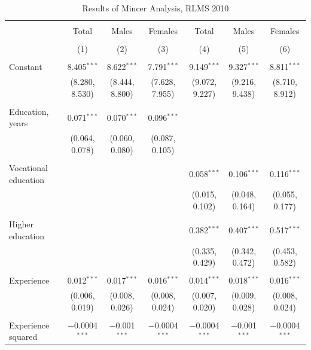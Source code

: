 \documentclass[alpha-refs]{wiley-article-01g}
\begin{document}
\begin{landscape}
	
	\fontsize{9}{11}
	\selectfont
	
	\begin{table}[!htbp] \centering 
\renewcommand{\arraystretch}{1.0}
		\caption{Results of Mincer Analysis, RLMS 2010} 
		\label{} 
		\begin{tabular}{@{\extracolsep{5pt}}lcccccc} 
			\\[-.8ex]\hline 
			\hline \\[-.8ex] 
			& Total & Males & Females & Total & Males & Females \\ 
			\\[-.8ex] & (1) & (2) & (3) & (4) & (5) & (6)\\ 
			\hline \\[-.8ex] 
			Constant & 8.405$^{***}$ & 8.622$^{***}$ & 7.791$^{***}$ & 9.149$^{***}$ & 9.327$^{***}$ & 8.811$^{***}$ \\ 
			& (8.280, 8.530) & (8.444, 8.800) & (7.628, 7.955) & (9.072, 9.227) & (9.216, 9.438) & (8.710, 8.912) \\ 
			& & & & & & \\ 
			Education, years & 0.071$^{***}$ & 0.070$^{***}$ & 0.096$^{***}$ &  &  &  \\ 
			& (0.064, 0.078) & (0.060, 0.080) & (0.087, 0.105) &  &  &  \\ 
			& & & & & & \\ 
			Vocational education &  &  &  & 0.058$^{***}$ & 0.106$^{***}$ & 0.116$^{***}$ \\ 
			&  &  &  & (0.015, 0.102) & (0.048, 0.164) & (0.055, 0.177) \\ 
			& & & & & & \\ 
			Higher education &  &  &  & 0.382$^{***}$ & 0.407$^{***}$ & 0.517$^{***}$ \\ 
			&  &  &  & (0.335, 0.429) & (0.342, 0.472) & (0.453, 0.582) \\ 
			& & & & & & \\ 
			Experience & 0.012$^{***}$ & 0.017$^{***}$ & 0.016$^{***}$ & 0.014$^{***}$ & 0.018$^{***}$ & 0.016$^{***}$ \\ 
			& (0.006, 0.019) & (0.008, 0.026) & (0.008, 0.024) & (0.007, 0.020) & (0.009, 0.028) & (0.008, 0.024) \\ 
			& & & & & & \\ 
			Experience squared & $-$0.0004$^{***}$ & $-$0.001$^{***}$ & $-$0.0004$^{***}$ & $-$0.0004$^{***}$ & $-$0.001$^{***}$ & $-$0.0004$^{***}$ \\ 

\end{tabular}
\end{table}
\end{landscape}
\end{document}

